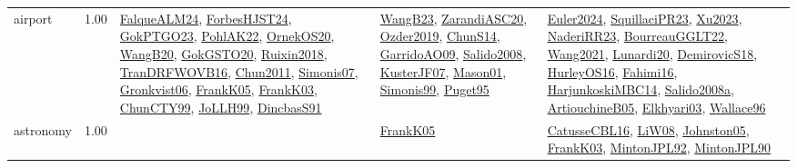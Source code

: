 {\begin{longtable}{p{3cm}r>{\raggedright\arraybackslash}p{6cm}>{\raggedright\arraybackslash}p{6cm}>{\raggedright\arraybackslash}p{8cm}}
\index{airport}\index{ApplicationAreas!airport}airport &  1.00 & \hyperref[detail:FalqueALM24]{FalqueALM24}, \hyperref[detail:ForbesHJST24]{ForbesHJST24}, \hyperref[detail:GokPTGO23]{GokPTGO23}, \hyperref[detail:PohlAK22]{PohlAK22}, \hyperref[detail:OrnekOS20]{OrnekOS20}, \hyperref[detail:WangB20]{WangB20}, \hyperref[detail:GokGSTO20]{GokGSTO20}, \hyperref[detail:Ruixin2018]{Ruixin2018}, \hyperref[detail:TranDRFWOVB16]{TranDRFWOVB16}, \hyperref[detail:Chun2011]{Chun2011}, \hyperref[detail:Simonis07]{Simonis07}, \hyperref[detail:Gronkvist06]{Gronkvist06}, \hyperref[detail:FrankK05]{FrankK05}, \hyperref[detail:FrankK03]{FrankK03}, \hyperref[detail:ChunCTY99]{ChunCTY99}, \hyperref[detail:JoLLH99]{JoLLH99}, \hyperref[detail:DincbasS91]{DincbasS91} & \hyperref[detail:WangB23]{WangB23}, \hyperref[detail:ZarandiASC20]{ZarandiASC20}, \hyperref[detail:Ozder2019]{Ozder2019}, \hyperref[detail:ChunS14]{ChunS14}, \hyperref[detail:GarridoAO09]{GarridoAO09}, \hyperref[detail:Salido2008]{Salido2008}, \hyperref[detail:KusterJF07]{KusterJF07}, \hyperref[detail:Mason01]{Mason01}, \hyperref[detail:Simonis99]{Simonis99}, \hyperref[detail:Puget95]{Puget95} & \hyperref[detail:Euler2024]{Euler2024}, \hyperref[detail:SquillaciPR23]{SquillaciPR23}, \hyperref[detail:Xu2023]{Xu2023}, \hyperref[detail:NaderiRR23]{NaderiRR23}, \hyperref[detail:BourreauGGLT22]{BourreauGGLT22}, \hyperref[detail:Wang2021]{Wang2021}, \hyperref[detail:Lunardi20]{Lunardi20}, \hyperref[detail:DemirovicS18]{DemirovicS18}, \hyperref[detail:HurleyOS16]{HurleyOS16}, \hyperref[detail:Fahimi16]{Fahimi16}, \hyperref[detail:HarjunkoskiMBC14]{HarjunkoskiMBC14}, \hyperref[detail:Salido2008a]{Salido2008a}, \hyperref[detail:ArtiouchineB05]{ArtiouchineB05}, \hyperref[detail:Elkhyari03]{Elkhyari03}, \hyperref[detail:Wallace96]{Wallace96}\\
\index{astronomy}\index{ApplicationAreas!astronomy}astronomy &  1.00 &  & \hyperref[detail:FrankK05]{FrankK05} & \hyperref[detail:CatusseCBL16]{CatusseCBL16}, \hyperref[detail:LiW08]{LiW08}, \hyperref[detail:Johnston05]{Johnston05}, \hyperref[detail:FrankK03]{FrankK03}, \hyperref[detail:MintonJPL92]{MintonJPL92}, \hyperref[detail:MintonJPL90]{MintonJPL90}\\

\end{longtable}}
